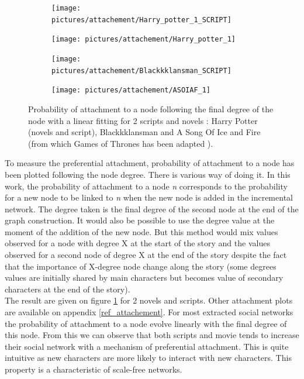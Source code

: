 \documentclass[a4paper, 12pt]{report}
\begin{document}
\begin{figure}
\begin{subfigure}{.49\textwidth}
\centering
\texttt{[image: pictures/attachement/Harry\_potter\_1\_SCRIPT]}
\end{subfigure}
\hfill
\begin{subfigure}{.49\textwidth}
\centering
\texttt{[image: pictures/attachement/Harry\_potter\_1]}
\end{subfigure}
\hfill
\begin{subfigure}{.49\textwidth}
\centering
\texttt{[image: pictures/attachement/Blackkklansman\_SCRIPT]}
\end{subfigure}
\hfill
\begin{subfigure}{.49\textwidth}
\texttt{[image: pictures/attachement/ASOIAF\_1]}
\end{subfigure}
\caption{Probability of attachment to a node following the final degree of the node with a linear fitting for 2 scripts and novels : Harry Potter (novels and script), Blackkklansman and A Song Of Ice and Fire (from which Games of Thrones has been adapted
).}
\label{attachement}
\end{figure}

To measure the preferential attachment, probability of attachment to a node has been plotted following the node degree. There is various way of doing it. In this work, the probability of attachment to a node \textit{n} corresponds to the probability for a new node to be linked to \textit{n} when the new node is added in the incremental network. The degree taken is the final degree of the second node at the end of the graph construction. It would also be possible to use the degree value at the moment of the addition of the new node. But this method would mix values observed for a node with degree X at the start of the story and the values observed for a second node of degree X at the end of the story despite the fact that the importance of X-degree node change along the story (some degrees values are initially shared by main characters but becomes value of secondary characters at the end of the story). \\

The result are given on figure \ref{attachement} for 2 novels and scripts. Other attachment plots are available on appendix \ref{ref_attachement}. For most extracted social networks the probability of attachment to a node evolve linearly with the final degree of this node. From this we can observe that both scripts and movie tends to increase their social network with a mechanism of preferential attachment. This is quite intuitive as new characters are more likely to interact with new characters. This property is a characteristic of scale-free networks.
\end{document}
